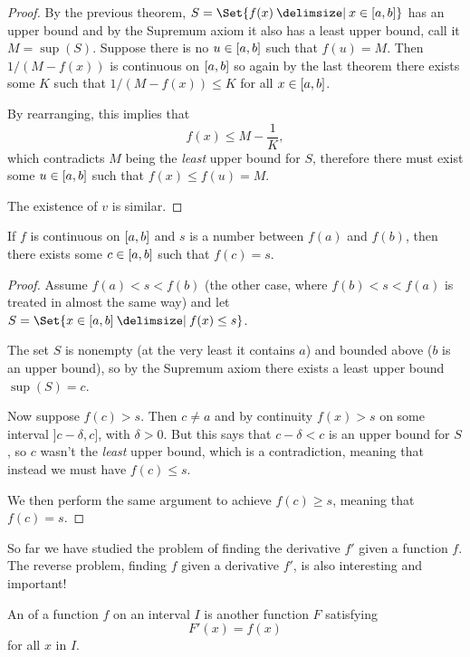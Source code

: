 \begin{proof}
	By the previous theorem, $S = \Set{f(x) \given x \in \interval{a}{b}}$ has an upper bound and by the Supremum axiom it also has a least upper bound, call it $M = \sup(S)$.
	Suppose there is no $u \in \interval{a}{b}$ such that $f(u) = M$.
	Then $1 / (M - f(x))$ is continuous on $\interval{a}{b}$ so again by the last theorem there exists some $K$ such that $1 / (M - f(x)) \leq K$ for all $x \in \interval{a}{b}$.

	By rearranging, this implies that
	\[
		f(x) \leq M - \frac{1}{K},
	\]
	which contradicts $M$ being the \emph{least} upper bound for $S$, therefore there must exist some $u \in \interval{a}{b}$ such that $f(x) \leq f(u) = M$.

	The existence of $v$ is similar.
\end{proof}

\begin{theorem}
	If $f$ is continuous on $\interval{a}{b}$ and $s$ is a number between $f(a)$ and $f(b)$, then there exists some $c \in \interval{a}{b}$ such that $f(c) = s$.
\end{theorem}

\begin{proof}
	Assume $f(a) < s < f(b)$ (the other case, where $f(b) < s < f(a)$ is treated in almost the same way) and let $S = \Set{x \in \interval{a}{b} \given f(x) \leq s}$.

	The set $S$ is nonempty (at the very least it contains $a$) and bounded above ($b$ is an upper bound), so by the Supremum axiom there exists a least upper bound $\sup(S) = c$.

	Now suppose $f(c) > s$.
	Then $c \neq a$ and by continuity $f(x) > s$ on some interval ${]{c - \delta, c}]}$, with $\delta > 0$.
	But this says that $c - \delta < c$ is an upper bound for $S$, so $c$ wasn't the \emph{least} upper bound, which is a contradiction, meaning that instead we must have $f(c) \leq s$.

	We then perform the same argument to achieve $f(c) \geq s$, meaning that $f(c) = s$.
\end{proof}


So far we have studied the problem of finding the derivative $f'$ given a function $f$.
The reverse problem, finding $f$ given a derivative $f'$, is also interesting and important!

\begin{definition}[Antiderivative]
	An  of a function $f$ on an interval $I$ is another function $F$ satisfying
	\[
		F'(x) = f(x)
	\]
	for all $x$ in $I$.
\end{definition}

